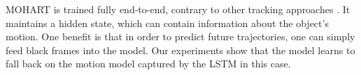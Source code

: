 \Gls{MOHART} is trained fully end-to-end, contrary to other tracking approaches \cite{Zhang2008,Milan2014,bae2017confidence,keuper2018motion}.
It maintains a hidden state, which can contain information about the object's motion. One benefit is that in order to predict future trajectories, one can simply feed black frames into the model. Our experiments show that the model learns to fall back on the motion model captured by the \gls{LSTM} in this case. 


